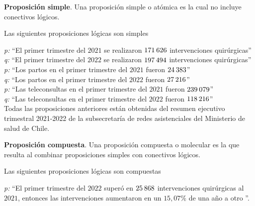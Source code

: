\begin{mydef}
\textbf{Proposición simple}. Una proposición simple o atómica es la cual no incluye conectivos lógicos.
\end{mydef}

\begin{myexample}
Las siguientes  proposiciones lógicas son simples
\end{myexample}
\noindent\textit{p:} ``El primer trimestre del $2021$ se realizaron $171\hspace{2px}626$ intervenciones quirúrgicas''\\
\textit{q:} ``El primer trimestre del $2022$ se realizaron $197\hspace{2px}494$ intervenciones quirúrgicas''\\

\noindent\textit{p:} ``Los partos en el primer trimestre del $2021$ fueron $24\hspace{2px}383$''\\
\textit{q:} ``Los partos en el primer trimestre del $2022$ fueron $27\hspace{2px}216$''\\

\noindent\textit{p:} ``Las teleconsultas en el primer trimestre del $2021$ fueron $239\hspace{2px}079$''\\
\textit{q:} ``Las teleconsultas en el primer trimestre del $2022$ fueron $118\hspace{2px}216$''\\

Todas las proposiciones anteriores están obtenidas del resumen ejecutivo trimestral 2021-2022 de la subsecretaría de redes asistenciales del Ministerio de salud de Chile.\\

\begin{mydef}
\textbf{Proposición compuesta}. Una proposición compuesta o molecular es la que resulta al combinar proposiciones simples con conectivos lógicos.
\end{mydef}

\begin{myexample}
Las siguientes proposiciones lógicas  son compuestas
\end{myexample}
\noindent\textit{p:} ``El primer trimestre del $2022$ superó en $25\hspace{2px}868$ intervenciones quirúrgicas al $2021$, entonces las intervenciones aumentaron en un $15,07\%$ de una año a otro ''.\\

